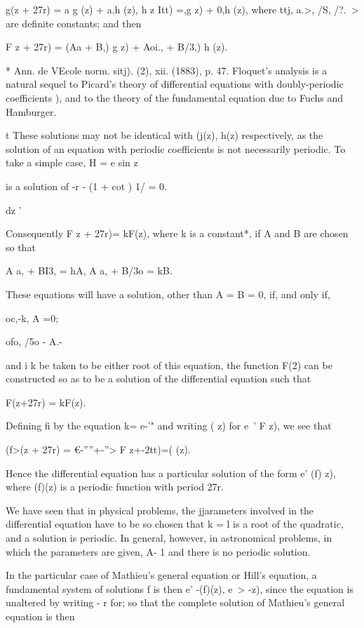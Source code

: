 g(z + 27r) = a g (z) + a,h (z), h z Itt) =,g z) + 0,h (z), where ttj,
a.>, /S, /?.\ > are definite constants; and then

F z + 27r) = (Aa + B,) g z) + Aoi., + B/3,) h (z).

* Ann. de VEcole norm. sitj). (2), xii. (1883), p. 47. Floquet's
analysis is a natural sequel to Picard's theory of differential
equations with doubly-periodic coefficients ), and to the
theory of the fundamental equation due to Fuchs and Hamburger.

t These solutions may not be identical with (j(z), h(z) respectively,
as the solution of an equation with periodic coefficients is not
necessarily periodic. To take a simple case, H = e sin z

is a solution of -r - (1 + cot ) 1/ = 0.

dz '

%
%

Consequently F z + 27r)= kF(z), where k is a constant*, if A and B are
chosen so that

A a, + BI3, = hA, A a, + B/3o = kB.

These equations will have a solution, other than A = B = 0, if, and
only if,

oc,-k, A =0;

ofo, /5o - A.-

and i k be taken to be either root of this equation, the function F(2)
can be constructed so as to be a solution of the differential equation
such that

F(z+27r) = kF(z).

Defining fi by the equation k= e-'" and writing ( z) for e~' F z), we
see that

(f>(z + 27r) = €-''''+-''> F z+-2tt)=( (z).

Hence the differential equation has a particular solution of the form
e' (f) z), where (f)(z) is a periodic function with period 27r.

We have seen that in physical problems, the jjarameters involved in
the differential equation have to be so chosen that k = l is a root of
the quadratic, and a solution is periodic. In general, however, in
astronomical problems, in which the parameters are given, A- 1 and
there is no periodic solution.

In the particular case of Mathieu's general equation or Hill's
equation, a fundamental system of solutions f is then e' -(f)(z), e~>
-z), since the equation is unaltered by writing - r for; so that the
complete solution of Mathieu's general equation is then

